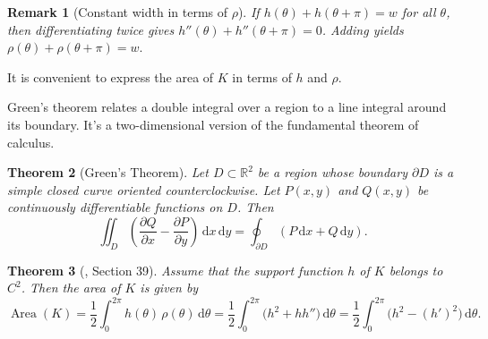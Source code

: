 \documentclass[11pt,letterpaper,reqno]{amsart}
\newcommand{\R}{\mathbb{R}}
\newcommand{\dd}{\,\mathrm{d}}
\newtheorem{theorem}{Theorem}[section]
\newtheorem{remark}[theorem]{Remark}
\providecommand{\R}{\mathbb{R}}
\begin{document}
\begin{remark}[Constant width in terms of $\rho$]
If $h(\theta)+h(\theta+\pi)=w$ for all $\theta$, then differentiating twice gives $h''(\theta)+h''(\theta+\pi)=0$. Adding yields
\(
\rho(\theta)+\rho(\theta+\pi)=w.
\)

\end{remark}

It is convenient to express the area of $K$ in terms of $h$ and $\rho$.

\begin{explanation}
    Green's theorem relates a double integral over a region to a line integral around its boundary. It's a two-dimensional version of the fundamental theorem of calculus.

\begin{theorem}[Green's Theorem]
Let $D\subset\R^2$ be a region whose boundary $\partial D$ is a simple closed curve oriented counterclockwise. Let $P(x,y)$ and $Q(x,y)$ be continuously differentiable functions on $D$. Then
\[
\iint_D\left(\frac{\partial Q}{\partial x}-\frac{\partial P}{\partial y}\right)\dd x\dd y=\oint_{\partial D}(P\dd x+Q\dd y).
\]
\end{theorem}

\end{explanation}

\begin{theorem}[\cite{Bonesen1987}, Section 39]
  \label{thm:area-formula}
Assume that the support function $h$ of $K$ belongs to $C^2$. Then
the area of $K$ is given by
\[
\operatorname{Area}(K)=\frac12\int_0^{2\pi} h(\theta)\,\rho(\theta)\dd\theta=\frac{1}{2}\int_0^{2\pi}\bigl(h^2+hh''\bigr)\dd\theta=\frac{1}{2}\int_0^{2\pi}\bigl(h^2-(h')^2\bigr)\dd\theta.
\]
\end{theorem}
\end{document}
